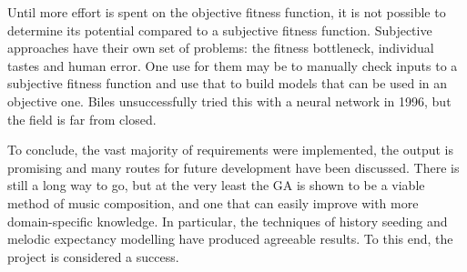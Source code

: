 Until more effort is spent on the objective fitness function, it is not possible to determine its
potential compared to a subjective fitness function. Subjective approaches have their own set of 
problems: the fitness bottleneck, individual tastes and human error. One use for them may be to
manually check inputs to a subjective fitness function and use that to build models that can be used in
an objective one. Biles unsuccessfully tried this with a neural network in 1996, but the field is
far from closed.

To conclude, the vast majority of requirements were implemented, the output is promising and many
routes for future development have been discussed. There is still a long way to go, but at the very
least the GA is shown to be a viable method of music composition, and one that can easily improve with more
domain-specific knowledge. In particular, the techniques of history seeding and melodic expectancy
modelling have produced agreeable results. To this end, the project is considered a success.

